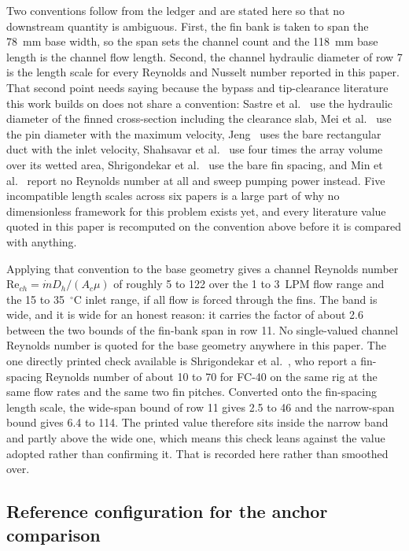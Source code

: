 Two conventions follow from the ledger and are stated here so that no downstream quantity is
ambiguous. First, the fin bank is taken to span the 78~mm base width, so the span sets the channel
count and the 118~mm base length is the channel flow length. Second, the channel hydraulic
diameter of row 7 is the length scale for every Reynolds and Nusselt number reported in this
paper. That second point needs saying because the bypass and tip-clearance literature this work
builds on does not share a convention: Sastre et al.~\cite{sastre2018} use the hydraulic diameter
of the finned cross-section including the clearance slab, Mei et al.~\cite{mei2014} use the pin
diameter with the maximum velocity, Jeng~\cite{jeng2008} uses the bare rectangular duct with the
inlet velocity, Shahsavar et al.~\cite{shahsavar2021} use four times the array volume over its
wetted area, Shrigondekar et al.~\cite{shrigondekar2023} use the bare fin spacing, and Min et
al.~\cite{min2004} report no Reynolds number at all and sweep pumping power instead. Five
incompatible length scales across six papers is a large part of why no dimensionless framework for
this problem exists yet, and every literature value quoted in this paper is recomputed on the
convention above before it is compared with anything.

Applying that convention to the base geometry gives a channel Reynolds number
$\mathrm{Re}_{ch}=\dot{m}D_h/(A_c\mu)$ of roughly 5 to 122 over the 1 to 3~LPM flow range and the
15 to 35~$^{\circ}$C inlet range, if all flow is forced through the fins. The band is wide, and it
is wide for an honest reason: it carries the factor of about 2.6 between the two bounds of the
fin-bank span in row 11. No single-valued channel Reynolds number is quoted for the base geometry
anywhere in this paper. The one directly printed check available is Shrigondekar et
al.~\cite{shrigondekar2023}, who report a fin-spacing Reynolds number of about 10 to 70 for FC-40
on the same rig at the same flow rates and the same two fin pitches. Converted onto the fin-spacing
length scale, the wide-span bound of row 11 gives 2.5 to 46 and the narrow-span bound gives 6.4 to
114. The printed value therefore sits inside the narrow band and partly above the wide one, which
means this check leans against the value adopted rather than confirming it. That is recorded here
rather than smoothed over.

\subsection{Reference configuration for the anchor comparison}
\label{sec:v3}

